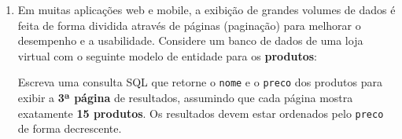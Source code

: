 \documentclass[12pt,a4paper]{article}
\begin{document}
\begin{enumerate}
    \item  Em muitas aplicações web e mobile, a exibição de grandes volumes de dados é feita de forma dividida através de páginas (paginação) para melhorar o desempenho e a usabilidade. Considere um banco de dados de uma loja virtual com o seguinte modelo de entidade para os \textbf{produtos}:
    
    \vspace{0.3cm}
    \begin{center}
    \end{center}
    \vspace{0.2cm}
    
    Escreva uma consulta SQL que retorne o \texttt{nome} e o \texttt{preco} dos produtos para exibir a \textbf{3ª página} de resultados, assumindo que cada página mostra exatamente \textbf{15 produtos}. Os resultados devem estar ordenados pelo \texttt{preco} de forma decrescente.
    
    \vspace{0.2cm}
    \noindent

    \vspace{0.5cm}
    



\end{enumerate}
\end{document}
